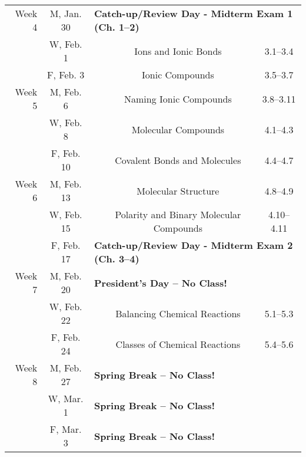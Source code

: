\documentclass[12pt, letterpaper]{article}
\begin{document}
\begin{tabular}{rcccc}
	\midrule
	Week 4 & M, Jan. 30 & \multicolumn{3}{l}{\textbf{Catch-up/Review Day - Midterm Exam 1 (Ch. 1--2)}}                                                                    \\
	       & W, Feb. 1  &                                                                              & Ions and Ionic Bonds                                & 3.1--3.4   \\
	       & F, Feb. 3  &                                                                              & Ionic Compounds                                     & 3.5--3.7   \\
	\midrule
	Week 5 & M, Feb. 6  &                                                                              & Naming Ionic Compounds                              & 3.8--3.11  \\
	       & W, Feb. 8  &                                                                              & Molecular Compounds                                 & 4.1--4.3   \\
	       & F, Feb. 10 &                                                                              & Covalent Bonds and Molecules                        & 4.4--4.7   \\
	\midrule
	Week 6 & M, Feb. 13 &                                                                              & Molecular Structure                                 & 4.8--4.9   \\
	       & W, Feb. 15 &                                                                              & Polarity and Binary Molecular Compounds             & 4.10--4.11 \\
	       & F, Feb. 17 & \multicolumn{3}{l}{\textbf{Catch-up/Review Day - Midterm Exam 2 (Ch. 3--4)}}                                                                    \\
	\midrule
	Week 7 & M, Feb. 20 & \multicolumn{3}{l}{\textbf{President's Day -- No Class!}}                                                                                       \\
	       & W, Feb. 22 &                                                                              & Balancing Chemical Reactions                        & 5.1--5.3   \\
	       & F, Feb. 24 &                                                                              & Classes of Chemical Reactions                       & 5.4--5.6   \\
	\midrule
	Week 8 & M, Feb. 27 & \multicolumn{3}{l}{\textbf{Spring Break -- No Class!}}                                                                                          \\
	       & W, Mar. 1  & \multicolumn{3}{l}{\textbf{Spring Break -- No Class!}}                                                                                          \\
	       & F, Mar. 3  & \multicolumn{3}{l}{\textbf{Spring Break -- No Class!}}                                                                                          \\
\end{tabular}
\end{document}
